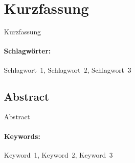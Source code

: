 \section*{\centering Kurzfassung}\thispagestyle{plain}\label{abstract-de}
Kurzfassung

\paragraph*{Schlagwörter:} Schlagwort~1, Schlagwort~2, Schlagwort~3

\clearpage

\begin{otherlanguage}{english}
	\section*{\centering Abstract}\thispagestyle{plain}\label{abstract-en}
	Abstract
	
	\paragraph*{Keywords:} Keyword~1, Keyword~2, Keyword~3
	\clearpage

\end{otherlanguage}